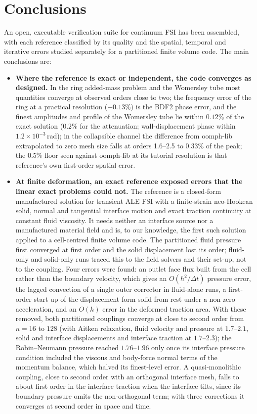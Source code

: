 \documentclass[sn-mathphys,Numbered]{sn-jnl}%
\begin{document}
\section{Conclusions} \label{sec:conclusion}
An open, executable verification suite for continuum FSI has been assembled, with each reference classified by its quality and the spatial, temporal and iterative errors studied separately for a partitioned finite volume code.
The main conclusions are:
\begin{itemize}
	\item \textbf{Where the reference is exact or independent, the code converges as designed.} In the ring added-mass problem and the Womersley tube most quantities converge at observed orders close to two; the frequency error of the ring at a practical resolution ($-0.13\%$) is the BDF2 phase error, and the finest amplitudes and profile of the Womersley tube lie within $0.12\%$ of the exact solution ($0.2\%$ for the attenuation; wall-displacement phase within $1.2\times10^{-3}\,\mathrm{rad}$); in the collapsible channel the difference from oomph-lib extrapolated to zero mesh size falls at orders 1.6--2.5 to $0.33\%$ of the peak; the $0.5\%$ floor seen against oomph-lib at its tutorial resolution is that reference's own first-order spatial error.
	\item \textbf{At finite deformation, an exact reference exposed errors that the linear exact problems could not.} The reference is a closed-form manufactured solution for transient ALE FSI with a finite-strain neo-Hookean solid, normal and tangential interface motion and exact traction continuity at constant fluid viscosity. It needs neither an interface source nor a manufactured material field and is, to our knowledge, the first such solution applied to a cell-centred finite volume code. The partitioned fluid pressure first converged at first order and the solid displacement lost its order; fluid-only and solid-only runs traced this to the field solvers and their set-up, not to the coupling. Four errors were found: an outlet face flux built from the cell rather than the boundary velocity, which gives an $O(h^2/\Delta t)$ pressure error, the lagged convection of a single outer corrector in fluid-alone runs, a first-order start-up of the displacement-form solid from rest under a non-zero acceleration, and an $O(h)$ error in the deformed traction area. With these removed, both partitioned couplings converge at close to second order from $n = 16$ to $128$ (with Aitken relaxation, fluid velocity and pressure at $1.7$--$2.1$, solid and interface displacements and interface traction at $1.7$--$2.3$); the Robin--Neumann pressure reached $1.76$--$1.96$ only once its interface pressure condition included the viscous and body-force normal terms of the momentum balance, which halved its finest-level error. A quasi-monolithic coupling, close to second order with an orthogonal interface mesh, falls to about first order in the interface traction when the interface tilts, since its boundary pressure omits the non-orthogonal term; with three corrections it converges at second order in space and time.

\end{itemize}
\end{document}
